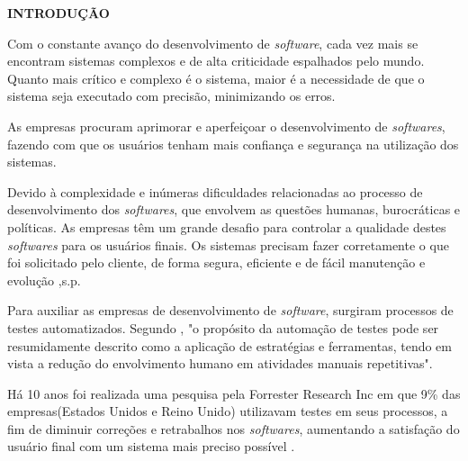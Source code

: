 \begin{flushleft}
	\vspace{1.2em}
	\textbf{\large INTRODUÇÃO}
	\vspace{2.9em}
\end{flushleft}


\par Com o constante avanço do desenvolvimento de \textit{software}, cada vez mais se encontram sistemas complexos e de alta criticidade espalhados pelo mundo. Quanto mais crítico e complexo é o sistema,  maior é a necessidade de que o sistema seja executado com precisão, minimizando os erros.

\par As empresas procuram aprimorar e aperfeiçoar o desenvolvimento de \textit{softwares}, fazendo com que os usuários tenham mais confiança e segurança na utilização dos sistemas.

\par Devido à complexidade e inúmeras dificuldades relacionadas ao processo de desenvolvimento dos \textit{softwares}, que envolvem as questões humanas, burocráticas e políticas. As empresas têm um grande desafio para controlar a qualidade destes \textit{softwares} para os usuários finais. Os sistemas precisam fazer corretamente o que foi solicitado pelo cliente, de forma segura, eficiente e de fácil manutenção e evolução \cite{ime},s.p.

\par Para auxiliar as empresas de desenvolvimento de \textit{software}, surgiram processos de testes automatizados. Segundo , "o propósito da automação de testes pode ser resumidamente descrito como a aplicação de estratégias e ferramentas, tendo em vista a redução do envolvimento humano em atividades manuais repetitivas".

\par Há 10 anos foi realizada uma pesquisa pela Forrester Research Inc em que 9\% das empresas(Estados Unidos e Reino Unido) utilizavam testes em seus processos, a fim de diminuir correções e retrabalhos nos \textit{softwares}, aumentando a satisfação do usuário final com um sistema mais preciso possível \cite{qualister}.

